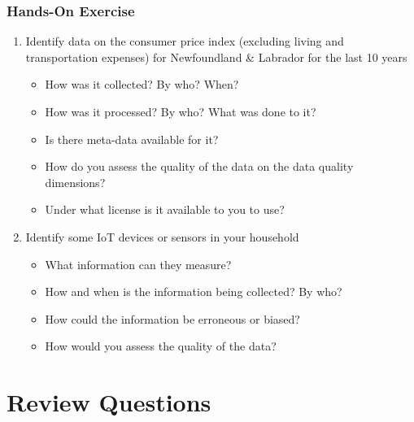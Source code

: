 \begin{tcolorbox}[colback=code]
\subsubsection*{Hands-On Exercise} 
\begin{enumerate}
	\item Identify data on the consumer price index (excluding living and transportation expenses) for Newfoundland \& Labrador for the last 10 years
	\begin{itemize}
		\item How was it collected? By who? When?
		\item How was it processed? By who? What was done to it?
		\item Is there meta-data available for it?
		\item How do you assess the quality of the data on the data quality dimensions?
		\item Under what license is it available to you to use?
	\end{itemize}
	\item Identify some IoT devices or sensors in your household
	\begin{itemize}
		\item What information can they measure?
		\item How and when is the information being collected? By who?
		\item How could the information be erroneous or biased?
		\item How would you assess the quality of the data?
	\end{itemize}
\end{enumerate}
\end{tcolorbox}


\section{Review Questions}

